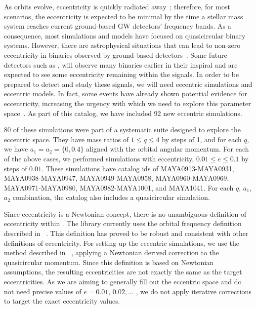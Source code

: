 \documentclass[
twocolumn,prd,
showpacs,
nofootinbib,
amsmath,amssymb,
superscriptaddress]{revtex4-1}
\begin{document}
As orbits evolve, eccentricity is quickly radiated away~\cite{PhysRev.136.B1224}; therefore, for most scenarios, the eccentricity is expected to be minimal by the time a stellar mass \bbh{} system reaches current ground-based GW detectors' frequency bands.
As a consequence, most \nr{} simulations and \gw{} models have focused on quasicircular binary systems. 
However, there are astrophysical situations that can lead to non-zero eccentricity in binaries observed by ground-based detectors~\cite{Romero-Shaw:2021ual, PhysRevD.97.103014, PhysRevLett.120.151101, Morscher_2015, Zevin_2019}.  
Some future \gw{} detectors such as \lisa{}, will observe many binaries earlier in their inspiral and are expected to see some eccentricity remaining within the signals. 
In order to be prepared to detect and study these signals, we will need eccentric \nr{} simulations and eccentric \gw{} models. 
In fact, some \lvk{} events have already shown potential evidence for eccentricity, increasing the urgency with which we need to explore this parameter space~\cite{Gayathri:2020coq, Romero-Shaw:2021ual}.
As part of this catalog, we have included 92 new eccentric simulations. 

80 of these simulations were part of a systematic suite designed to explore the eccentric space.
They have mass ratios of $1 \le q \le 4$ by steps of 1, and for each $q$, we have $a_1 = a_2 = \{0, 0.4\}$ aligned with the orbital angular momentum.
For each of the above cases, we performed simulations with eccentricity, $0.01 \le e \le 0.1$ by steps of $0.01.$
These simulations have catalog ids of MAYA0913-MAYA0931, MAYA0938-MAYA0947, MAYA0949-MAYA0958, MAYA0960-MAYA0969, MAYA0971-MAYA0980,  MAYA0982-MAYA1001, and MAYA1041.
For each $q$, $a_1$, $a_2$ combination, the catalog also includes a quasicircular simulation.

Since eccentricity is a Newtonian concept, there is no unambiguous definition of eccentricity within \gr{}.
The \mayawaves{} library currently uses the orbital frequency definition described in ~\cite{Ramos-Buades:2018azo}.
This definition has proved to be robust and consistent with other definitions of eccentricity.
For setting up the eccentric simulations, we use the method described in ~\cite{Gayathri:2020coq}, applying a Newtonian derived correction to the quasicircular momentum.
Since this definition is based on Newtonian assumptions, the resulting eccentricities are not exactly the same as the target eccentricities.
As we are aiming to generally fill out the eccentric space and do not need precise values of $e=0.01, \,0.02, $... , we do not apply iterative corrections to target the exact eccentricity values.
\end{document}

